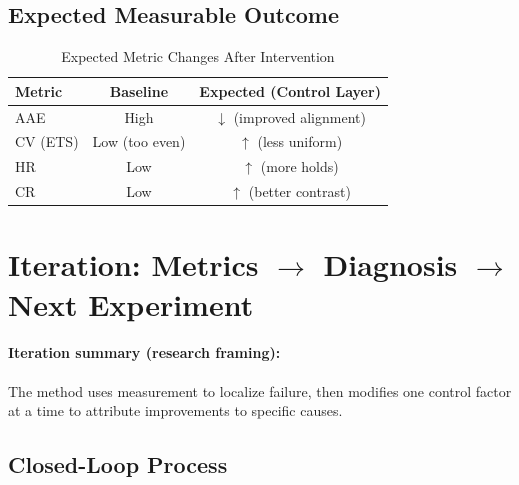 \documentclass[11pt,a4paper]{article}
\begin{document}
\subsection{Expected Measurable Outcome}

\begin{table}[H]
\centering
\caption{Expected Metric Changes After Intervention}
\label{tab:expected-outcomes}
\begin{tabular}{@{}lcc@{}}
\toprule
\textbf{Metric} & \textbf{Baseline} & \textbf{Expected (Control Layer)} \\
\midrule
AAE & High & $\downarrow$ (improved alignment) \\
CV (ETS) & Low (too even) & $\uparrow$ (less uniform) \\
HR & Low & $\uparrow$ (more holds) \\
CR & Low & $\uparrow$ (better contrast) \\
\bottomrule
\end{tabular}
\end{table}

\section{Iteration: Metrics $\rightarrow$ Diagnosis $\rightarrow$ Next Experiment}

\paragraph{Iteration summary (research framing):} The method uses measurement to localize failure, then modifies one control factor at a time to attribute improvements to specific causes.

\subsection{Closed-Loop Process}
\end{document}
